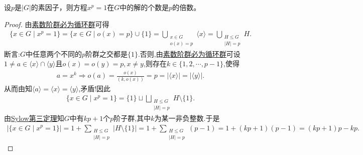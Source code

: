 \documentclass[../../main.tex]{subfiles}%
\begin{document}
\begin{example}
设$p$是$|G|$的素因子，则方程$x^p=1$在$G$中的解的个数是$p$的倍数。
\end{example}
\begin{proof}
由\hyperref[proposition:素数阶群必为循环群]{素数阶群必为循环群}可得
\begin{align*}
\{ x\in G\mid x^p=1 \} =\{ x\in G\mid o(x)=p \} \cup \{ 1 \} =\bigcup\limits_{\substack{x\in G\\o(x)=p}}{\langle x \rangle}=\bigcup\limits_{\substack{H\leqslant G\\|H|=p}}{H}.
\end{align*}
断言:$G$中任意两个不同的$p$阶群之交都是$\{ 1 \}$.否则,由\hyperref[proposition:素数阶群必为循环群]{素数阶群必为循环群}可设$1\ne a\in \langle x \rangle \cap \langle y \rangle$且$o(x)=o(y)=p,x\ne y$,则存在$k\in \{ 1,2,\cdots ,p-1 \} $,使得
\begin{align*}
a=x^k\Longrightarrow o(a)=\frac{o(x)}{(k,o(x))}=p=| \langle x \rangle |=| \langle y \rangle |.
\end{align*}
从而由知$\langle a \rangle =\langle x \rangle =\langle y \rangle $,矛盾!因此
\begin{align*}
\{ x\in G\mid x^p=1 \} =\{ 1 \} \sqcup \bigsqcup\limits_{\substack{H\leqslant G\\|H|=p}}{H\setminus \{ 1 \}}.
\end{align*}
由\hyperref[theorem:Sylow第三定理]{Sylow第三定理}知$G$中有$kp+1$个$p$阶子群,其中$k$为某一非负整数.于是
\begin{align*}
| \{ x\in G\mid x^p=1 \} |=1+\sum\limits_{\substack{H\leqslant G\\|H|=p}}{| H\setminus \{ 1 \} |}=1+\sum\limits_{\substack{H\leqslant G\\|H|=p}}{(p-1)}=1+(kp+1)(p-1)=(kp+1)p-kp.
\end{align*}
\end{proof}
\end{document}
